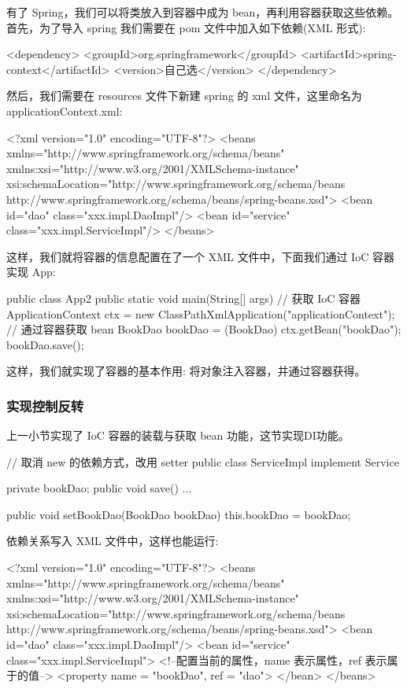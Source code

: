 有了 Spring，我们可以将类放入到容器中成为 bean，再利用容器获取这些依赖。首先，为了导入 spring 我们需要在 pom 文件中加入如下依赖(XML 形式):

\begin{xml}
<dependency>
    <groupId>org.springframework</groupId>
    <artifactId>spring-context</artifactId>
    <version>自己选</version>
</dependency>
\end{xml}

然后，我们需要在 resources 文件下新建 spring 的 xml 文件，这里命名为 applicationContext.xml:

\begin{xml}
<?xml version="1.0" encoding="UTF-8"?>
<beans xmlns="http://www.springframework.org/schema/beans"
       xmlns:xsi="http://www.w3.org/2001/XMLSchema-instance"
       xsi:schemaLocation="http://www.springframework.org/schema/beans http://www.springframework.org/schema/beans/spring-beans.xsd">
<bean id="dao" class="xxx.impl.DaoImpl"/>
<bean id="service" class="xxx.impl.ServiceImpl"/>
</beans>
\end{xml}

这样，我们就将容器的信息配置在了一个 XML 文件中，下面我们通过 IoC 容器实现 App:

\begin{Java}
public class App2 {
    public static void main(String[] args) {
        // 获取 IoC 容器
        ApplicationContext ctx = new ClassPathXmlApplication("applicationContext");
        // 通过容器获取 bean
        BookDao bookDao = (BookDao) ctx.getBean("bookDao");
        bookDao.save();
    }
}
\end{Java}

这样，我们就实现了容器的基本作用: 将对象注入容器，并通过容器获得。

\subsubsection*{实现控制反转}

上一小节实现了 IoC 容器的装载与获取 bean 功能，这节实现DI功能。

\begin{Java}
// 取消 new 的依赖方式，改用 setter
public class ServiceImpl implement Service {
    private bookDao;
    public void save() { ... }

    public void setBookDao(BookDao bookDao) {
        this.bookDao = bookDao;
    }
}
\end{Java}

依赖关系写入 XML 文件中，这样也能运行:
\begin{xml}
<?xml version="1.0" encoding="UTF-8"?>
<beans xmlns="http://www.springframework.org/schema/beans"
       xmlns:xsi="http://www.w3.org/2001/XMLSchema-instance"
       xsi:schemaLocation="http://www.springframework.org/schema/beans http://www.springframework.org/schema/beans/spring-beans.xsd">
<bean id="dao" class="xxx.impl.DaoImpl"/>
<bean id="service" class="xxx.impl.ServiceImpl">
    <!--配置当前的属性，name 表示属性，ref 表示属于的值-->
    <property name = "bookDao", ref = "dao">
</bean>
</beans>
\end{xml}

\newpage
